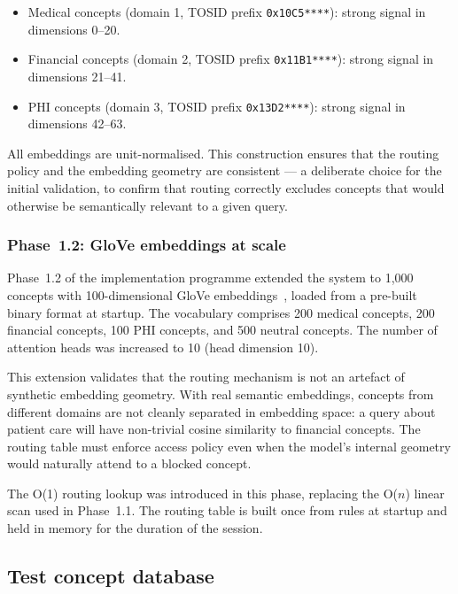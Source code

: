 \documentclass[11pt,a4paper]{article}
\theoremstyle{definition}
\begin{document}
\begin{itemize}
  \item Medical concepts (domain 1, TOSID prefix \texttt{0x10C5****}):
        strong signal in dimensions 0--20.
  \item Financial concepts (domain 2, TOSID prefix \texttt{0x11B1****}):
        strong signal in dimensions 21--41.
  \item PHI concepts (domain 3, TOSID prefix \texttt{0x13D2****}):
        strong signal in dimensions 42--63.
\end{itemize}

All embeddings are unit-normalised. This construction ensures that the
routing policy and the embedding geometry are consistent --- a deliberate
choice for the initial validation, to confirm that routing correctly excludes
concepts that would otherwise be semantically relevant to a given query.

\subsubsection{Phase~1.2: GloVe embeddings at scale}
\label{sec:phase0402}

Phase~1.2 of the implementation programme extended the system to 1,000
concepts with 100-dimensional GloVe embeddings~\cite{Pennington2014}, loaded
from a pre-built binary format at startup. The vocabulary comprises 200
medical concepts, 200 financial concepts, 100 PHI concepts, and 500 neutral
concepts. The number of attention heads was increased to 10 (head dimension
10).

This extension validates that the routing mechanism is not an artefact of
synthetic embedding geometry. With real semantic embeddings, concepts from
different domains are not cleanly separated in embedding space: a query
about patient care will have non-trivial cosine similarity to financial
concepts. The routing table must enforce access policy even when the model's
internal geometry would naturally attend to a blocked concept.

The O(1) routing lookup was introduced in this phase, replacing the O($n$)
linear scan used in Phase~1.1. The routing table is built once from rules
at startup and held in memory for the duration of the session.

\subsection{Test concept database}
\label{sec:testdb}
\end{document}
